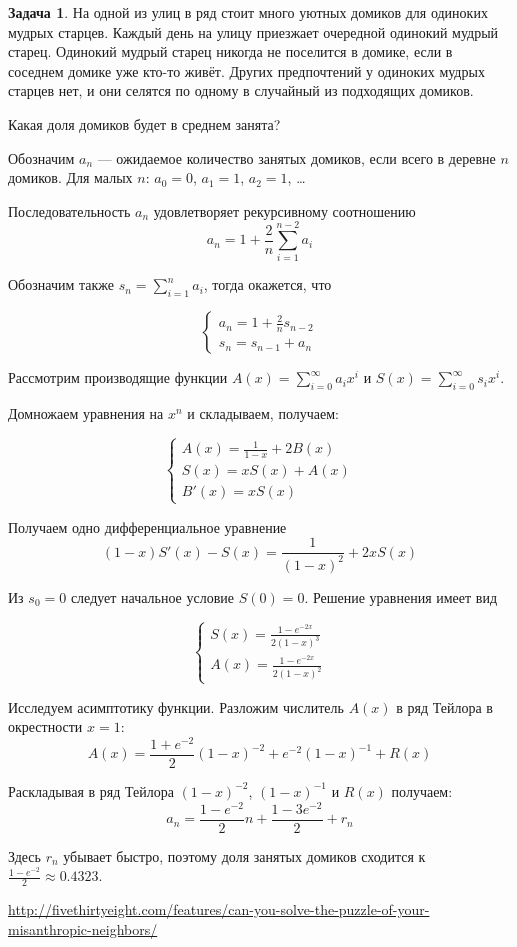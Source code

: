 \documentclass[nobib]{tufte-handout}
\theoremstyle{definition}
\newtheorem{problem}{Задача}
\begin{document}
\begin{problem}
На одной из улиц в ряд стоит много уютных домиков для одиноких мудрых старцев. Каждый день на улицу приезжает очередной одинокий мудрый старец. Одинокий мудрый старец никогда не поселится в домике, если в соседнем домике уже кто-то живёт. Других предпочтений у одиноких мудрых старцев нет, и они селятся по одному в случайный из подходящих домиков.

Какая доля домиков будет в среднем занята?


\begin{sol}
Обозначим $a_n$ — ожидаемое количество занятых домиков, если всего в деревне $n$ домиков. Для малых $n$: $a_0=0$, $a_1=1$, $a_2=1$, \ldots

Последовательность $a_n$ удовлетворяет рекурсивному соотношению
\[
a_n = 1 + \frac{2}{n}\sum_{i=1}^{n-2} a_i
\]

Обозначим также $s_n = \sum_{i=1}^n a_i$, тогда окажется, что

\[
\begin{cases}
a_n = 1 + \frac{2}{n}s_{n-2} \\
s_n = s_{n-1} + a_n
\end{cases}
\]

Рассмотрим производящие функции $A(x)=\sum_{i=0}^{\infty} a_i x^i$ и $S(x)=\sum_{i=0}^{\infty} s_i x^i$.

Домножаем уравнения на $x^n$ и складываем, получаем:

\[
\begin{cases}
A(x) = \frac{1}{1-x} + 2B(x) \\
S(x) = xS(x) + A(x) \\
B'(x)=xS(x)
\end{cases}
\]

Получаем одно дифференциальное уравнение
\[
(1-x)S'(x) - S(x) = \frac{1}{(1-x)^2} + 2xS(x)
\]

Из $s_0=0$ следует начальное условие $S(0)=0$. Решение уравнения имеет вид

\[
\begin{cases}
S(x)=\frac{1-e^{-2x}}{2(1-x)^3} \\
A(x)=\frac{1-e^{-2x}}{2(1-x)^2}
\end{cases}
\]

Исследуем асимптотику функции. Разложим числитель $A(x)$ в ряд Тейлора в окрестности $x=1$:
\[
A(x)= \frac{1 + e^{-2}}{2} (1-x)^{-2} + e^{-2}(1-x)^{-1} + R(x)
\]

Раскладывая в ряд Тейлора $(1-x)^{-2}$, $(1-x)^{-1}$ и $R(x)$ получаем:
\[
a_n = \frac{1-e^{-2}}{2}n + \frac{1-3e^{-2}}2 + r_n
\]

Здесь $r_n$ убывает быстро, поэтому доля занятых домиков сходится к $\frac{1-e^{-2}}{2} \approx 0.4323$.

\url{http://fivethirtyeight.com/features/can-you-solve-the-puzzle-of-your-misanthropic-neighbors/}
\end{sol}


\end{problem}
\end{document}
